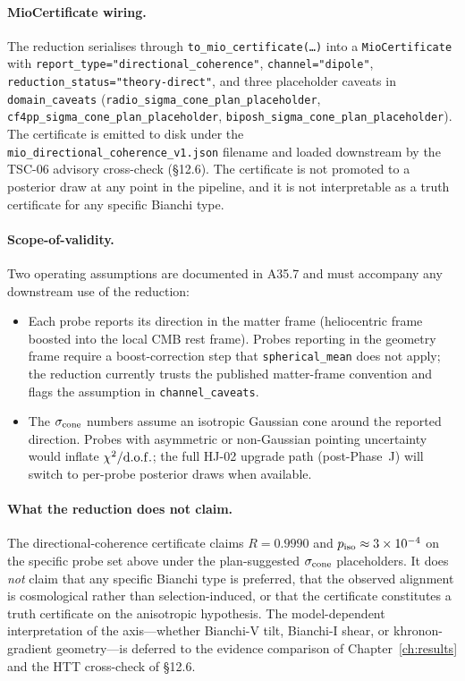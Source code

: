 \paragraph{MioCertificate wiring.}

The reduction serialises through
\texttt{to\_mio\_certificate(\dots)} into a
\texttt{MioCertificate} with
\texttt{report\_type="directional\_coherence"},
\texttt{channel="dipole"},
\texttt{reduction\_status="theory-direct"}, and three
placeholder caveats in \texttt{domain\_caveats}
(\texttt{radio\_sigma\_cone\_plan\_placeholder},
\texttt{cf4pp\_sigma\_cone\_plan\_placeholder},
\texttt{biposh\_sigma\_cone\_plan\_placeholder}).  The
certificate is emitted to disk under the
\texttt{mio\_directional\_coherence\_v1.json} filename and
loaded downstream by the TSC-06 advisory cross-check
(§12.6).  The certificate is not promoted to a posterior
draw at any point in the pipeline, and it is not
interpretable as a truth certificate for any specific
Bianchi type.

\paragraph{Scope-of-validity.}

Two operating assumptions are documented in A35.7 and must
accompany any downstream use of the reduction:

\begin{itemize}
\item Each probe reports its direction in the matter frame
  (heliocentric frame boosted into the local CMB rest
  frame).  Probes reporting in the geometry frame require a
  boost-correction step that
  \texttt{spherical\_mean} does not apply; the reduction
  currently trusts the published matter-frame convention
  and flags the assumption in
  \texttt{channel\_caveats}.
\item The $\sigma_{\rm cone}$ numbers assume an isotropic
  Gaussian cone around the reported direction.  Probes
  with asymmetric or non-Gaussian pointing uncertainty
  would inflate $\chi^2/{\rm d.o.f.}$; the full
  HJ-02 upgrade path (post-Phase~J) will switch to
  per-probe posterior draws when available.
\end{itemize}

\paragraph{What the reduction does not claim.}

The directional-coherence certificate claims $R=0.9990$ and
$p_{\rm iso} \approx 3 \times 10^{-4}$ on the specific
probe set above under the plan-suggested $\sigma_{\rm cone}$
placeholders.  It does \emph{not} claim that any specific
Bianchi type is preferred, that the observed alignment is
cosmological rather than selection-induced, or that the
certificate constitutes a truth certificate on the
anisotropic hypothesis.  The model-dependent interpretation
of the axis---whether Bianchi-V tilt, Bianchi-I shear, or
khronon-gradient geometry---is deferred to the evidence
comparison of Chapter~\ref{ch:results} and the HTT
cross-check of §12.6.


